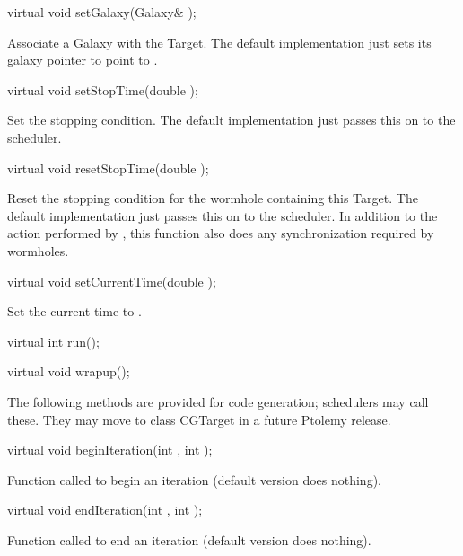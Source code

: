 \begin{example}
virtual void setGalaxy(Galaxy& );
\end{example}

Associate a Galaxy with the Target.  The default implementation
just sets its galaxy pointer  to point to .

\begin{example}
virtual void setStopTime(double );
\end{example}

Set the stopping condition.  The default implementation just passes
this on to the scheduler.

\begin{example}
virtual void resetStopTime(double );
\end{example}

Reset the stopping condition for the wormhole containing this Target.
The default implementation just passes this on to the scheduler.  In
addition to the action performed by , this function
also does any synchronization required by wormholes.

\begin{example}
virtual void setCurrentTime(double );
\end{example}

Set the current time to .

\begin{example}
virtual int run();
\end{example}

\begin{example}
virtual void wrapup();
\end{example}

The following methods are provided for code generation; schedulers may
call these.  They may move to class CGTarget in a future Ptolemy release.

\begin{example}
virtual void beginIteration(int , int );
\end{example}

Function called to begin an iteration (default version
does nothing).

\begin{example}
virtual void endIteration(int , int );
\end{example}

Function called to end an iteration (default version
does nothing).

